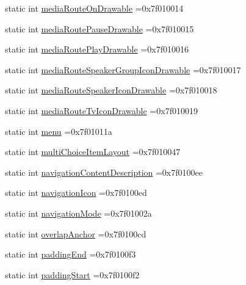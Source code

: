 \begin{DoxyCompactItemize}
\item 
static int \hyperlink{classandroid_1_1support_1_1v4_1_1R_1_1attr_ab0b06761d2a873fde85c520765dc2885}{media\+Route\+On\+Drawable} =0x7f010014
\item 
static int \hyperlink{classandroid_1_1support_1_1v4_1_1R_1_1attr_a80277237767ae78c2a6f73dbf259f031}{media\+Route\+Pause\+Drawable} =0x7f010015
\item 
static int \hyperlink{classandroid_1_1support_1_1v4_1_1R_1_1attr_a35785252e897cedea7f5d3b142714130}{media\+Route\+Play\+Drawable} =0x7f010016
\item 
static int \hyperlink{classandroid_1_1support_1_1v4_1_1R_1_1attr_ad8ca3d50e107f0e94925dc041f82ffaa}{media\+Route\+Speaker\+Group\+Icon\+Drawable} =0x7f010017
\item 
static int \hyperlink{classandroid_1_1support_1_1v4_1_1R_1_1attr_a6c046be1d80e71de6815589ce8e9c033}{media\+Route\+Speaker\+Icon\+Drawable} =0x7f010018
\item 
static int \hyperlink{classandroid_1_1support_1_1v4_1_1R_1_1attr_ab5014dab3a8b837aa988a3f15246fc9d}{media\+Route\+Tv\+Icon\+Drawable} =0x7f010019
\item 
static int \hyperlink{classandroid_1_1support_1_1v4_1_1R_1_1attr_a116926a875584a4fd631fc2f1113af9e}{menu} =0x7f01011a
\item 
static int \hyperlink{classandroid_1_1support_1_1v4_1_1R_1_1attr_a3ae545489edf2089f9aeb66fc5c69707}{multi\+Choice\+Item\+Layout} =0x7f010047
\item 
static int \hyperlink{classandroid_1_1support_1_1v4_1_1R_1_1attr_ae8b1add32bd7b6f2205c9f7569130ffa}{navigation\+Content\+Description} =0x7f0100ee
\item 
static int \hyperlink{classandroid_1_1support_1_1v4_1_1R_1_1attr_a2393d3f1cec603657e15756cff171b98}{navigation\+Icon} =0x7f0100ed
\item 
static int \hyperlink{classandroid_1_1support_1_1v4_1_1R_1_1attr_a1777f34b52b7f62ca810e74432643515}{navigation\+Mode} =0x7f01002a
\item 
static int \hyperlink{classandroid_1_1support_1_1v4_1_1R_1_1attr_a0c8163501c5bda57b67869aa588edc63}{overlap\+Anchor} =0x7f0100cd
\item 
static int \hyperlink{classandroid_1_1support_1_1v4_1_1R_1_1attr_a16d2d8f352681074b9a4bcedf9a6bb01}{padding\+End} =0x7f0100f3
\item 
static int \hyperlink{classandroid_1_1support_1_1v4_1_1R_1_1attr_a43901dbed7432f76b991b19a0d9d2c3f}{padding\+Start} =0x7f0100f2
\item 

\end{DoxyCompactItemize}
